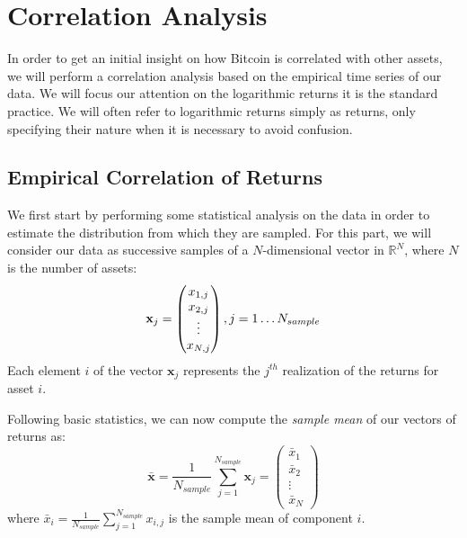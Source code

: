 \chapter{Correlation Analysis}
\label{chpr:corr_analysis}
In order to get an initial insight on how Bitcoin is correlated with other assets, we will perform a correlation analysis based on the empirical time series of our data. We will focus our attention on the logarithmic returns it is the standard practice. We will often refer to logarithmic returns simply as returns, only specifying their nature when it is necessary to avoid confusion.


\bigskip

\section{Empirical Correlation of Returns}
\label{emp_corr}

We first start by performing some statistical analysis on the data in order to estimate the distribution from which they are sampled.
For this part, we will consider our data as successive samples of a $N$-dimensional vector in $\mathbb{R}^{N}$, where $N$ is the number of assets:
\begin{equation*}
	\mathbf{x}_{j}\\
	 = \begin{pmatrix}
	x_{1,j} \\
	x_{2,j}	\\
	\vdots\\
	x_{N,j}
	\end{pmatrix} , j = 1 \dots N_{sample}
\end{equation*}
Each element $i$ of the vector $\mathbf{x}_j$ represents the $j^{th}$ realization of the returns for asset $i$.

Following basic statistics, we can now compute the \textit{sample mean} of our vectors of returns as:
\begin{equation*}
	\mathbf{\bar{x}} = \frac{1}{N_{sample}} \sum_{j=1}^{N_{sample}} \mathbf{x}_j =
	\begin{pmatrix}
	\bar{x}_{1} \\
	\bar{x}_{2}	\\
	\vdots\\
	\bar{x}_{N}
	\end{pmatrix}
\end{equation*}
where $\bar{x}_{i} = \frac{1}{N_{sample}} \sum_{j=1}^{N_{sample}} x_{i,j}$ is the sample mean of component $i$.

